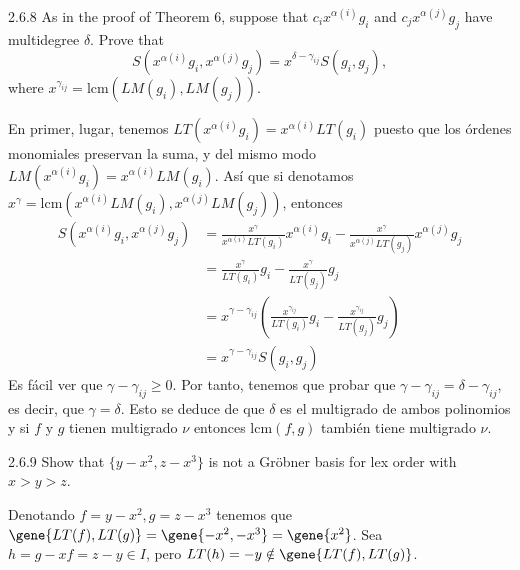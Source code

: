 \documentclass[twoside]{article}
\begin{document}
\newpage

\begin{ejercicio}{2.6.8}
As in the proof of Theorem 6, suppose that $c_ix^{α(i)}g_i$ and $c_jx^{α(j)}g_j$ have multidegree $δ$.
Prove that
$$S(x^{α(i)}g_i, x^{α(j)}g_j) = x^{δ−γ_{ij}}S(g_i, g_j),$$
where $x^{γ_{ij}} = \mathrm{lcm}(LM(g_i), LM(g_j))$.
\end{ejercicio}
\begin{solucion}
En primer, lugar, tenemos $LT(x^{\alpha(i)}g_i)=x^{\alpha(i)}LT(g_i)$ puesto que los órdenes monomiales preservan la suma, y del mismo modo $LM(x^{\alpha(i)}g_i)=x^{\alpha(i)}LM(g_i)$. Así que si denotamos $x^{\gamma}=\mathrm{lcm}(x^{α(i)}LM(g_i),x^{α(j)}LM(g_j))$, entonces 
\begin{align*}S(x^{α(i)}g_i, x^{α(j)}g_j)&=\frac{x^{\gamma}}{x^{\alpha(i)}LT(g_i)}x^{α(i)}g_i-\frac{x^{\gamma}}{x^{\alpha(j)}LT(g_j)}x^{α(j)}g_j\\
&=\frac{x^{\gamma}}{LT(g_i)}g_i-\frac{x^{\gamma}}{LT(g_j)}g_j\\
&=x^{\gamma-\gamma_{ij}}\left(\frac{x^{\gamma_{ij}}}{LT(g_i)}g_i-\frac{x^{\gamma_{ij}}}{LT(g_j)}g_j\right)\\
&=x^{\gamma-\gamma_{ij}} S(g_i,g_j)
\end{align*}
Es fácil ver que $\gamma-\gamma_{ij}\geq 0$. Por tanto, tenemos que probar que $\gamma-\gamma_{ij}=\delta-\gamma_{ij}$, es decir, que $\gamma = \delta$.  Esto se deduce de que $\delta$ es el multigrado de ambos polinomios y si $f$ y $g$ tienen multigrado $\nu$ entonces $\mathrm{lcm}(f,g)$ también tiene multigrado $\nu$.
\end{solucion}

\newpage

\begin{ejercicio}{2.6.9}
Show that $\{y − x^2, z − x^3\}$ is not a Gröbner basis for lex order with $x > y > z$.
\end{ejercicio}
\begin{solucion}
Denotando $f=y − x^2,g=z − x^3$ tenemos que $\gene{LT(f),LT(g)}=\gene{-x^2,-x^3}=\gene{x^2}$. Sea $h=g-xf=z-y\in I$, pero $LT(h)=-y\notin\gene{LT(f),LT(g)}$.
\end{solucion}

\newpage
\end{document}
